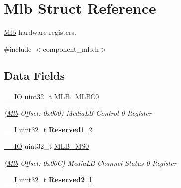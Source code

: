 \hypertarget{structMlb}{}\section{Mlb Struct Reference}
\label{structMlb}


\mbox{\hyperlink{structMlb}{Mlb}} hardware registers.  




{\ttfamily \#include $<$component\+\_\+mlb.\+h$>$}

\subsection*{Data Fields}
\begin{DoxyCompactItemize}
\item 
\mbox{\label{structMlb_aa32a9ecf0fd9656985aad902281bcfeb}} 
\mbox{\hyperlink{core__cm7_8h_aec43007d9998a0a0e01faede4133d6be}{\+\_\+\+\_\+\+IO}} uint32\+\_\+t \mbox{\hyperlink{structMlb_aa32a9ecf0fd9656985aad902281bcfeb}{M\+L\+B\+\_\+\+M\+L\+B\+C0}}
\begin{DoxyCompactList}\small\item\em (\mbox{\hyperlink{structMlb}{Mlb}} Offset\+: 0x000) Media\+LB Control 0 Register \end{DoxyCompactList}\item 
\mbox{\label{structMlb_a36015dae15c55b55a26c576373a222a3}} 
\mbox{\hyperlink{core__cm7_8h_af63697ed9952cc71e1225efe205f6cd3}{\+\_\+\+\_\+I}} uint32\+\_\+t {\bfseries Reserved1} \mbox{[}2\mbox{]}
\item 
\mbox{\label{structMlb_a282389b34209e09fa39ffb82e1249f06}} 
\mbox{\hyperlink{core__cm7_8h_aec43007d9998a0a0e01faede4133d6be}{\+\_\+\+\_\+\+IO}} uint32\+\_\+t \mbox{\hyperlink{structMlb_a282389b34209e09fa39ffb82e1249f06}{M\+L\+B\+\_\+\+M\+S0}}
\begin{DoxyCompactList}\small\item\em (\mbox{\hyperlink{structMlb}{Mlb}} Offset\+: 0x00C) Media\+LB Channel Status 0 Register \end{DoxyCompactList}\item 
\mbox{\label{structMlb_a06c18c19f1f4777d0165bfaceb0a259f}} 
\mbox{\hyperlink{core__cm7_8h_af63697ed9952cc71e1225efe205f6cd3}{\+\_\+\+\_\+I}} uint32\+\_\+t {\bfseries Reserved2} \mbox{[}1\mbox{]}

\end{DoxyCompactItemize}
